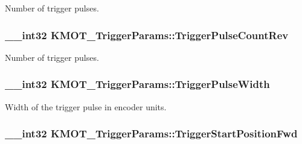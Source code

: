 Number of trigger pulses. 

\subsubsection[{\texorpdfstring{Trigger\+Pulse\+Count\+Rev}{TriggerPulseCountRev}}]{\setlength{\rightskip}{0pt plus 5cm}\+\_\+\+\_\+int32 K\+M\+O\+T\+\_\+\+Trigger\+Params\+::\+Trigger\+Pulse\+Count\+Rev}\hypertarget{struct_k_m_o_t___trigger_params_a6d7852bb11b5cd67aa50fb846b8669b4}{}\label{struct_k_m_o_t___trigger_params_a6d7852bb11b5cd67aa50fb846b8669b4}


Number of trigger pulses. 

\subsubsection[{\texorpdfstring{Trigger\+Pulse\+Width}{TriggerPulseWidth}}]{\setlength{\rightskip}{0pt plus 5cm}\+\_\+\+\_\+int32 K\+M\+O\+T\+\_\+\+Trigger\+Params\+::\+Trigger\+Pulse\+Width}\hypertarget{struct_k_m_o_t___trigger_params_ac7e5764e2dce32833db1cf051e9702a8}{}\label{struct_k_m_o_t___trigger_params_ac7e5764e2dce32833db1cf051e9702a8}


Width of the trigger pulse in encoder units. 

\subsubsection[{\texorpdfstring{Trigger\+Start\+Position\+Fwd}{TriggerStartPositionFwd}}]{\setlength{\rightskip}{0pt plus 5cm}\+\_\+\+\_\+int32 K\+M\+O\+T\+\_\+\+Trigger\+Params\+::\+Trigger\+Start\+Position\+Fwd}\hypertarget{struct_k_m_o_t___trigger_params_a2ac8be83d5cb5e055ad156bed5d546f0}{}\label{struct_k_m_o_t___trigger_params_a2ac8be83d5cb5e055ad156bed5d546f0}


